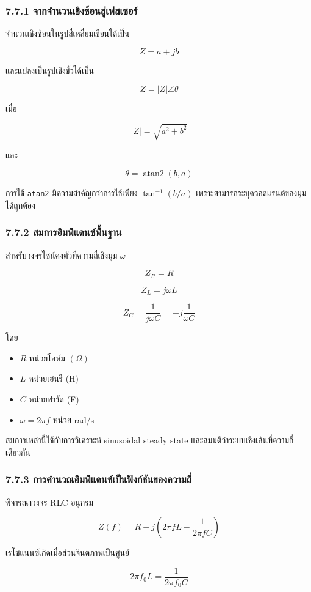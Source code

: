 \subsubsection{7.7.1 จากจำนวนเชิงซ้อนสู่เฟสเซอร์}

จำนวนเชิงซ้อนในรูปสี่เหลี่ยมเขียนได้เป็น

\[
Z=a+jb
\]

และแปลงเป็นรูปเชิงขั้วได้เป็น

\[
Z=|Z|\angle\theta
\]

เมื่อ

\[
|Z|=\sqrt{a^2+b^2}
\]

และ

\[
\theta=\operatorname{atan2}(b,a)
\]

การใช้ \texttt{atan2} มีความสำคัญกว่าการใช้เพียง $\tan^{-1}(b/a)$ เพราะสามารถระบุควอดแรนต์ของมุมได้ถูกต้อง

\subsubsection{7.7.2 สมการอิมพีแดนซ์พื้นฐาน}

สำหรับวงจรไซน์คงตัวที่ความถี่เชิงมุม $\omega$

\[
Z_R=R
\]

\[
Z_L=j\omega L
\]

\[
Z_C=\frac{1}{j\omega C}=-j\frac{1}{\omega C}
\]

โดย

\begin{itemize}
    \item $R$ หน่วยโอห์ม $(\Omega)$
    \item $L$ หน่วยเฮนรี (H)
    \item $C$ หน่วยฟารัด (F)
    \item $\omega=2\pi f$ หน่วย rad/s
\end{itemize}

สมการเหล่านี้ใช้กับการวิเคราะห์ sinusoidal steady state และสมมติว่าระบบเชิงเส้นที่ความถี่เดียวกัน

\subsubsection{7.7.3 การคำนวณอิมพีแดนซ์เป็นฟังก์ชันของความถี่}

พิจารณาวงจร RLC อนุกรม

\[
Z(f)=R+j\left(2\pi fL-\frac{1}{2\pi fC}\right)
\]

เรโซแนนซ์เกิดเมื่อส่วนจินตภาพเป็นศูนย์

\[
2\pi f_0L=\frac{1}{2\pi f_0C}
\]

